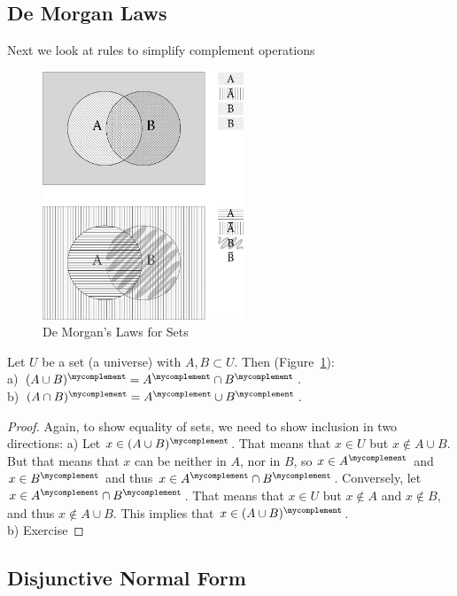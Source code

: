 \subsection{De Morgan Laws}

Next we look at rules to simplify complement operations

\begin{figure}[t]
\begin{center}
\includegraphics[width=6cm]{pic/VennDeMorganLaws.pdf}
\end{center}
\caption{De Morgan's Laws for Sets}
\label{figdemorganset}
\end{figure}

\begin{thm}
Let $U$ be a set (a universe) with $A,B\subset U$.
Then (Figure~\ref{figdemorganset}):\\
a) $(A\cup B)^\mycomplement=A^\mycomplement\cap B^\mycomplement$.\\
b) $(A\cap B)^\mycomplement=A^\mycomplement\cup B^\mycomplement$.
\end{thm}
\begin{proof}
Again, to show equality of sets, we need to show inclusion in two directions:
a) Let $x\in (A\cup B)^\mycomplement$. That means that $x\in U$ but $x\not\in
A\cup B$. But that means that $x$ can be neither in $A$, nor in $B$, so
$x\in A^\mycomplement$ and $x\in B^\mycomplement$ and thus $x\in
A^\mycomplement\cap B^\mycomplement$.
Conversely, let $x\in A^\mycomplement\cap B^\mycomplement$.
That means that $x\in U$ but $x\not\in A$ and
$x\not\in B$, and thus $x\not\in A\cup B$. This implies that
$x\in(A\cup B)^\mycomplement$.\\
b) Exercise
\end{proof}

\subsection{Disjunctive Normal Form}

